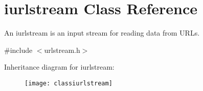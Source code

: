\hypertarget{classiurlstream}{}\section{iurlstream Class Reference}
\label{classiurlstream}


An {\ttfamily iurlstream} is an input stream for reading data from U\+R\+Ls.  




{\ttfamily \#include $<$urlstream.\+h$>$}

Inheritance diagram for iurlstream\+:\begin{figure}[H]
\begin{center}
\leavevmode
\texttt{[image: classiurlstream]}
\end{center}
\end{figure}
